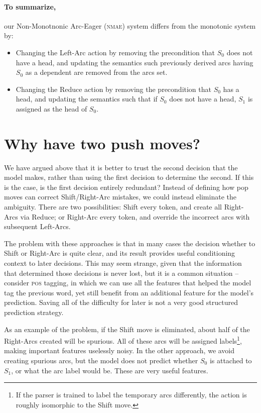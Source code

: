 \documentclass[11pt,letterpaper]{article}
\newcommand{\pos}{\textsc{pos}\xspace}
\newcommand{\nmae}{\textsc{nmae}\xspace}
\begin{document}
\noindent\paragraph{To summarize,} our Non-Monotnonic Arc-Eager (\nmae) system
differs from the monotonic system by:
\begin{itemize}
   \item Changing the Left-Arc action by removing the precondition that $S_0$
   does not have a head, and updating the semantics such previously
   derived arcs having $S_0$ as a dependent are removed from the arcs set.

   \item Changing the Reduce action by removing the precondition that $S_0$
   has a head, and updating the semantics such that if $S_0$ does not have
   a head, $S_1$ is assigned as the head of $S_0$.
\end{itemize}


\section{Why have two push moves?}
\label{ref:shiftless}

We have argued above that it is better to trust the second decision that the model
makes, rather than using the first decision to determine the second. If this is
the case, is the first decision entirely redundant?
Instead of defining how pop moves can correct Shift/Right-Arc mistakes, we could
instead eliminate the ambiguity. There are two possibilities:
Shift every token, and create all Right-Arcs via Reduce; or Right-Arc every token,
and override the incorrect arcs with subsequent Left-Arcs.

The problem with these approaches is that in many cases the decision whether
to Shift or Right-Arc is quite clear, and its result provides useful
conditioning context to later decisions.
This may seem strange, given that the information that determined those decisions
is never lost, but it is a common situation -- consider \pos tagging, in which 
we can use all the features that helped the model tag the previous word, yet still
benefit from an additional feature for the model's prediction.
Saving all of the difficulty for later
is not a very good structured prediction strategy. 

As an example of the problem, if the Shift move is
eliminated, about half of the Right-Arcs created will be spurious. All of these
arcs will be assigned labels\footnote{If the parser is trained to label the temporary
arcs differently, the action is roughly isomorphic to the Shift move.},
making important features uselessly noisy. In the other approach, we avoid creating
spurious arcs, but the model does not predict whether $S_0$ is attached to $S_1$,
or what the arc label would be. These are very useful features.
\end{document}
